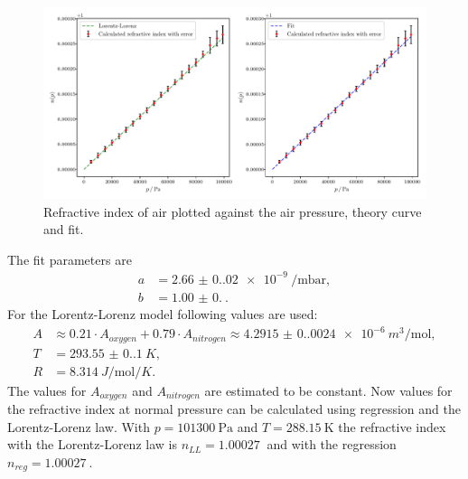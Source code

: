 \begin{figure}[H]
  \centering
  \includegraphics[width=\textwidth]{../build/air_and_lorentz.pdf}
  \caption{Refractive index of air plotted against the air pressure, theory curve and fit.}
  \label{fig:air}
\end{figure}

The fit parameters are
\begin{align*}
  a &= \SI{2.66(0.02)e-9}{\per\milli\bar}, \\
  b &= \SI{1.00(0.00)}{}.
\end{align*}
For the Lorentz-Lorenz model following values are used:
\begin{align*}
  A &\approx {0.21\cdot A_{oxygen}+0.79\cdot A_{nitrogen}} \approx \SI{4.2915(0.0024)e-6}{m^3\per\mol},\\
  T &= \SI{293.55(0.1)}{K},\\
  R &= \SI{8.314}{J\per\mol\per K}.
\end{align*}
The values for $A_{oxygen}$\cite{A_oxy} and $A_{nitrogen}$\cite{A_nit} are estimated to be constant.
Now values for the refractive index at normal pressure can be calculated using regression and the Lorentz-Lorenz law.
With $p = \SI{101300}{\pascal}$ and $T = \SI{288.15}{\kelvin}$ the refractive index with the
Lorentz-Lorenz law is $n_{LL} = \SI{1.00027}{}$ and with the regression $n_{reg} = \SI{1.00027}{}$.
\newpage